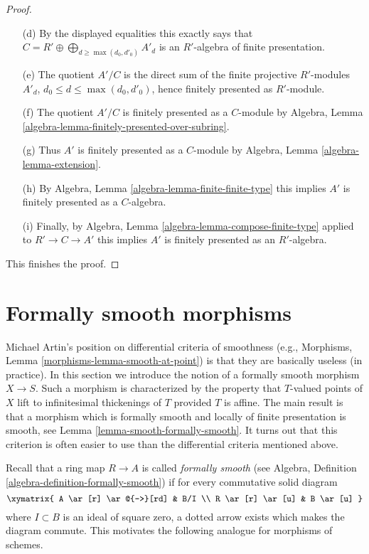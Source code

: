 \begin{proof}
\begin{enumerate}
\item[(d)] By the displayed equalities this exactly says that
$C = R' \oplus \bigoplus_{d \geq \max(d_0, d'_0)} A'_d$
is an $R'$-algebra of finite presentation.
\item[(e)] The quotient $A'/C$ is the direct sum of the finite
projective $R'$-modules $A'_d$, $d_0 \leq d \leq \max(d_0, d'_0)$,
hence finitely presented as $R'$-module.
\item[(f)] The quotient $A'/C$ is finitely presented
as a $C$-module by Algebra, Lemma
\ref{algebra-lemma-finitely-presented-over-subring}.
\item[(g)] Thus $A'$ is finitely presented as a $C$-module by
Algebra, Lemma \ref{algebra-lemma-extension}.
\item[(h)] By Algebra, Lemma \ref{algebra-lemma-finite-finite-type}
this implies $A'$ is finitely presented as a $C$-algebra.
\item[(i)] Finally, by
Algebra, Lemma \ref{algebra-lemma-compose-finite-type}
applied to $R' \to C \to A'$
this implies $A'$ is finitely presented as an $R'$-algebra.
\end{enumerate}
This finishes the proof.
\end{proof}









\section{Formally smooth morphisms}
\label{section-formally-smooth}

\noindent
Michael Artin's position on differential criteria of smoothness (e.g.,
Morphisms, Lemma \ref{morphisms-lemma-smooth-at-point}) is that they are
basically useless (in practice). In this section we introduce the
notion of a formally smooth morphism $X \to S$. Such a morphism is
characterized by the property that $T$-valued points of $X$ lift
to infinitesimal thickenings of $T$ provided $T$ is affine.
The main result is that a morphism which is formally smooth and
locally of finite presentation is smooth, see
Lemma \ref{lemma-smooth-formally-smooth}.
It turns out that this criterion is often easier to use than the
differential criteria mentioned above.

\medskip\noindent
Recall that a ring map $R \to A$ is called {\it formally smooth}
(see Algebra, Definition \ref{algebra-definition-formally-smooth})
if for every commutative solid diagram
$$
\xymatrix{
A \ar[r] \ar@{-->}[rd] & B/I \\
R \ar[r] \ar[u] & B \ar[u]
}
$$
where $I \subset B$ is an ideal of square zero, a dotted
arrow exists which makes the diagram commute. This motivates
the following analogue for morphisms of schemes.

